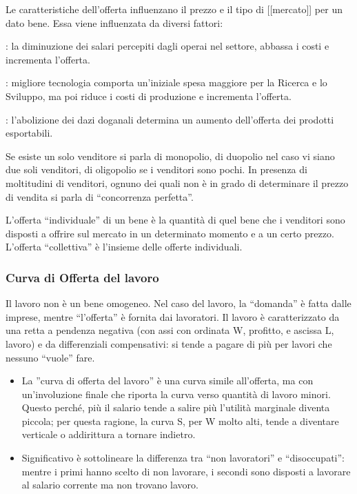 Le caratteristiche dell'offerta influenzano il prezzo e il tipo di [[mercato]] 
per un dato bene.
Essa viene influenzata da diversi fattori:
\begin{description} [noitemsep]
 \item [Costi di produzione]: la diminuzione dei salari percepiti dagli 
operai nel settore, abbassa i costi e incrementa l'offerta.
 \item [Tecnologia]: migliore tecnologia comporta un'iniziale spesa maggiore 
per la Ricerca e lo Sviluppo, ma poi riduce i costi di produzione e incrementa 
l'offerta.
 \item [Prezzi]
 \item [Politiche governative]: l'abolizione dei dazi doganali determina un 
aumento dell'offerta dei prodotti esportabili.
\end{description}

Se esiste un solo venditore si parla di monopolio, di duopolio nel caso 
vi siano due soli venditori, di oligopolio se i venditori sono pochi. In 
presenza di moltitudini di venditori, ognuno dei quali non è in grado di 
determinare il prezzo di vendita si parla di ``concorrenza perfetta''.

L'offerta ``individuale'' di un bene è la quantità di quel bene che i venditori 
sono disposti a offrire sul mercato in un determinato momento e a un certo 
prezzo. L'offerta ``collettiva'' è l'insieme delle offerte individuali.

\subsubsection{Curva di Offerta del lavoro}

Il lavoro non è un bene omogeneo. 
Nel caso del lavoro, la ``domanda'' è fatta dalle imprese, mentre ``l'offerta'' 
è fornita dai lavoratori.
Il lavoro è caratterizzato da una retta a pendenza negativa (con assi con 
ordinata W, profitto, e ascissa L, lavoro) e da differenziali compensativi: si 
tende a pagare di più per lavori che nessuno ``vuole'' fare.

\begin{itemize} [noitemsep]
 \item La ''curva di offerta del lavoro'' è una curva simile all'offerta, ma 
con un'involuzione finale che riporta la curva verso quantità di lavoro minori. 
Questo perché, più il salario tende a salire più l'utilità marginale diventa 
piccola; per questa ragione, la curva S, per W molto alti, tende a diventare 
verticale o addirittura a tornare indietro.
 \item Significativo è sottolineare la differenza tra ``non lavoratori'' e 
``disoccupati'': mentre i primi hanno scelto di non lavorare, i secondi sono 
disposti a lavorare al salario corrente ma non trovano lavoro.
\end{itemize}


